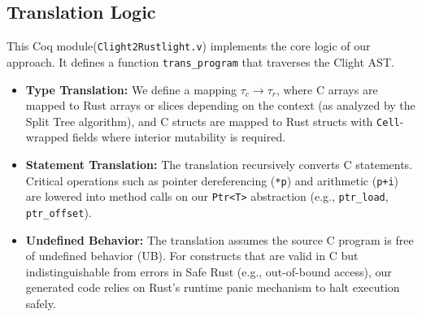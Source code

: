 \documentclass{llncs} %
\begin{document}

\subsection{Translation Logic}
This Coq module(\texttt{Clight2Rustlight.v}) implements the core logic of our approach. It defines a function \texttt{trans\_program} that traverses the Clight AST.
\begin{itemize}
    \item \textbf{Type Translation:} We define a mapping $\tau_c \to \tau_r$, where C arrays are mapped to Rust arrays or slices depending on the context (as analyzed by the Split Tree algorithm), and C structs are mapped to Rust structs with \texttt{Cell}-wrapped fields where interior mutability is required.
    \item \textbf{Statement Translation:} The translation recursively converts C statements. Critical operations such as pointer dereferencing (\texttt{*p}) and arithmetic (\texttt{p+i}) are lowered into method calls on our \texttt{Ptr<T>} abstraction (e.g., \texttt{ptr\_load}, \texttt{ptr\_offset}).
    \item \textbf{Undefined Behavior:} The translation assumes the source C program is free of undefined behavior (UB). For constructs that are valid in C but indistinguishable from errors in Safe Rust (e.g., out-of-bound access), our generated code relies on Rust's runtime panic mechanism to halt execution safely.
\end{itemize}


\end{document}
